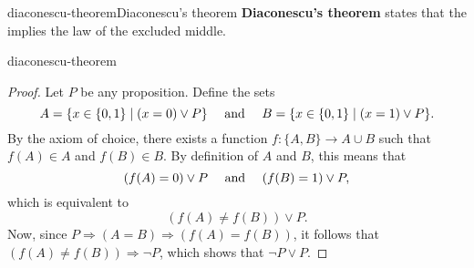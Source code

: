 \begin{topic}{diaconescu-theorem}{Diaconescu's theorem}
    \textbf{Diaconescu's theorem} states that the  implies the law of the excluded middle.
\end{topic}

\begin{example}{diaconescu-theorem}
    \begin{proof}
        Let $P$ be any proposition. Define the sets
        \[ A = \{ x \in \{ 0, 1 \} \mid (x = 0) \lor P \} \quad \textup{ and } \quad B = \{ x \in \{ 0, 1 \} \mid (x = 1) \lor P \} . \]
        By the axiom of choice, there exists a function $f : \{ A, B \} \to A \cup B$ such that $f(A) \in A$ and $f(B) \in B$. By definition of $A$ and $B$, this means that
        \[ (f(A) = 0) \lor P \quad \textup{ and } \quad (f(B) = 1) \lor P , \]
        which is equivalent to
        \[ (f(A) \ne f(B)) \lor P . \]
        Now, since $P \Rightarrow (A = B) \Rightarrow (f(A) = f(B))$, it follows that $(f(A) \ne f(B)) \Rightarrow \neg P$, which shows that $\neg P \lor P$.
    \end{proof}
\end{example}
